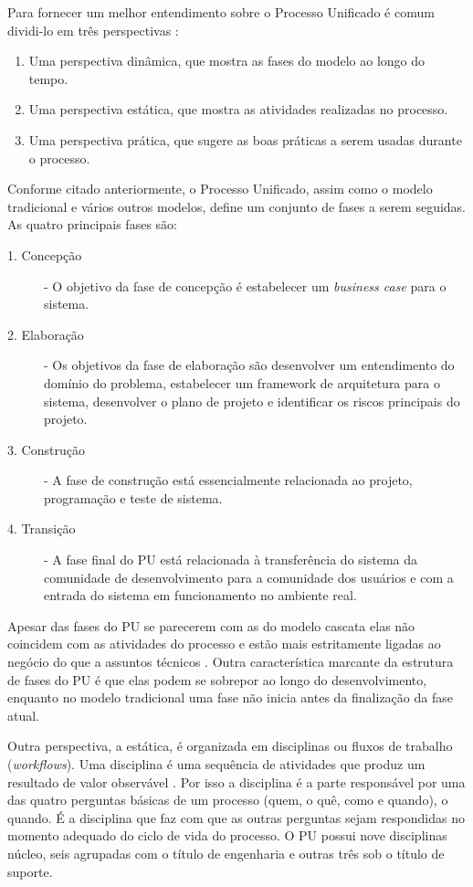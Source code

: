 \documentclass[
	article,			%
	11pt,				%
	oneside,			%
	a4paper,			%
	english,			%
	brazil,				%
	sumario=tradicional
	]{abntex2}
\begin{document}
Para fornecer um melhor entendimento sobre o Processo Unificado é comum
dividi-lo em três perspectivas \cite{sommerville2007}:

\begin{enumerate}
   \item Uma perspectiva dinâmica, que mostra as fases do modelo ao longo do
   tempo.
   \item Uma perspectiva  estática, que mostra as atividades realizadas no
   processo.
   \item Uma perspectiva prática, que sugere as boas práticas a serem usadas
   durante o processo.
\end{enumerate}

Conforme citado anteriormente, o Processo Unificado, assim como o modelo
tradicional e vários outros modelos, define um conjunto de fases a serem
seguidas. As quatro principais fases são:

\begin{description}
   \item[1. Concepção] - O objetivo da fase de concepção é estabelecer um
   \textit{business case} para o sistema.
   \item[2. Elaboração] - Os objetivos da fase de elaboração são desenvolver um
   entendimento do domínio do problema, estabelecer um framework de arquitetura
   para o sistema, desenvolver o plano de projeto e identificar os riscos
   principais do projeto.
   \item[3. Construção] - A fase de construção está essencialmente relacionada
   ao projeto, programação e teste de sistema.
   \item[4. Transição] - A fase final do PU está relacionada à transferência do
   sistema da comunidade de desenvolvimento para a comunidade dos usuários e com
   a entrada do sistema em funcionamento no ambiente real.
\end{description}

Apesar das fases do PU se parecerem com as do modelo cascata elas não coincidem
com as atividades do processo e estão mais estritamente ligadas ao negócio do
que a assuntos técnicos \cite{sommerville2007}. Outra característica marcante
da estrutura de fases do PU é que elas podem se sobrepor ao longo do
desenvolvimento, enquanto no modelo tradicional uma fase não inicia antes da
finalização da fase atual.

Outra perspectiva, a estática, é organizada em disciplinas ou fluxos de trabalho
(\textit{workflows}). Uma disciplina é uma sequência de atividades que produz um
resultado de valor observável \cite{Corporation1998}. Por isso a disciplina é a
parte responsável por uma das quatro perguntas básicas de um processo (quem, o
quê, como e quando), o quando. É a disciplina que faz com que as outras
perguntas sejam respondidas no momento adequado do ciclo de vida do processo. O
PU possui nove disciplinas núcleo, seis agrupadas com o título de engenharia e
outras três sob o título de suporte.
\end{document}
